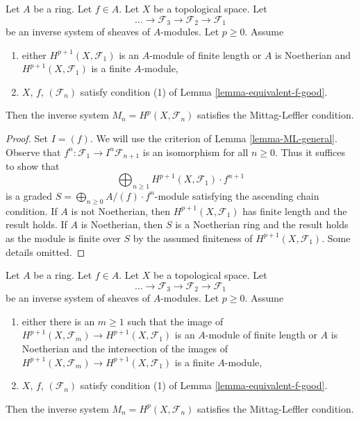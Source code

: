 \begin{lemma}
\label{lemma-ML}
Let $A$ be a ring. Let $f \in A$. Let $X$ be a topological space. Let
$$
\ldots \to \mathcal{F}_3 \to \mathcal{F}_2 \to \mathcal{F}_1
$$
be an inverse system of sheaves of $A$-modules. Let $p \geq 0$. Assume
\begin{enumerate}
\item either $H^{p + 1}(X, \mathcal{F}_1)$ is an $A$-module of finite length
or $A$ is Noetherian and $H^{p + 1}(X, \mathcal{F}_1)$ is a finite $A$-module,
\item $X$, $f$, $(\mathcal{F}_n)$ satisfy condition (1) of
Lemma \ref{lemma-equivalent-f-good}.
\end{enumerate}
Then the inverse system $M_n = H^p(X, \mathcal{F}_n)$ satisfies the
Mittag-Leffler condition.
\end{lemma}

\begin{proof}
Set $I = (f)$. We will use the criterion of Lemma \ref{lemma-ML-general}.
Observe that $f^n : \mathcal{F}_1 \to I^n\mathcal{F}_{n + 1}$
is an isomorphism for all $n \geq 0$.
Thus it suffices to show that
$$
\bigoplus\nolimits_{n \geq 1} H^{p + 1}(X, \mathcal{F}_1) \cdot f^{n + 1}
$$
is a graded $S = \bigoplus_{n \geq 0} A/(f) \cdot f^n$-module satisfying the
ascending chain condition. If $A$ is not Noetherian, then
$H^{p + 1}(X, \mathcal{F}_1)$ has finite length and the result holds.
If $A$ is Noetherian, then $S$ is a Noetherian ring and the result
holds as the module is finite over $S$ by the assumed finiteness
of $H^{p + 1}(X, \mathcal{F}_1)$. Some details omitted.
\end{proof}

\begin{lemma}
\label{lemma-ML-better}
Let $A$ be a ring. Let $f \in A$. Let $X$ be a topological space. Let
$$
\ldots \to \mathcal{F}_3 \to \mathcal{F}_2 \to \mathcal{F}_1
$$
be an inverse system of sheaves of $A$-modules. Let $p \geq 0$. Assume
\begin{enumerate}
\item either there is an $m \geq 1$ such that the image of
$H^{p + 1}(X, \mathcal{F}_m) \to H^{p + 1}(X, \mathcal{F}_1)$
is an $A$-module of finite length or $A$ is Noetherian
and the intersection of the images of
$H^{p + 1}(X, \mathcal{F}_m) \to H^{p + 1}(X, \mathcal{F}_1)$
is a finite $A$-module,
\item $X$, $f$, $(\mathcal{F}_n)$ satisfy condition (1) of
Lemma \ref{lemma-equivalent-f-good}.
\end{enumerate}
Then the inverse system $M_n = H^p(X, \mathcal{F}_n)$ satisfies the
Mittag-Leffler condition.
\end{lemma}

